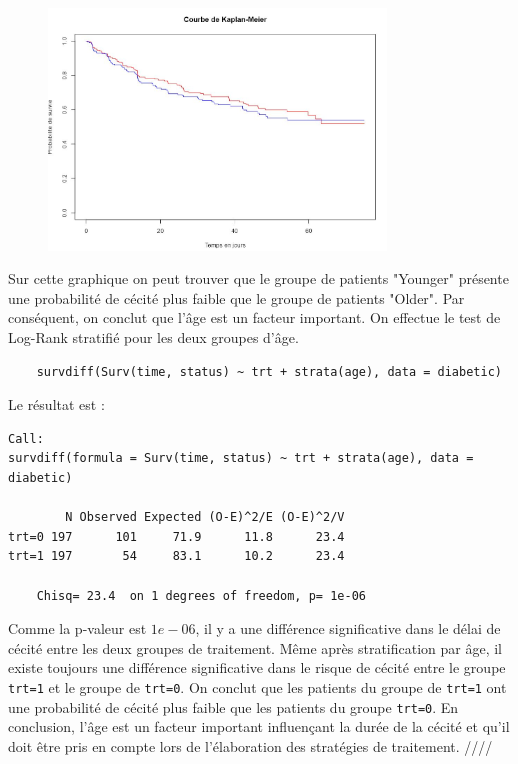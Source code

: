 \documentclass[../main.tex]{subfiles}
\begin{document}
\begin{CJK*}{UTF8}{gbsn}
\begin{figure}[H]
    \centering
    \includegraphics[width=0.8\textwidth]{1F.JPG}
    \label{fig:mesh1}
\end{figure}
  
Sur cette graphique on peut trouver que le groupe de patients "Younger"
présente une probabilité de cécité plus faible que le groupe de patients "Older".
Par conséquent, on conclut que l'âge est un facteur important.
On effectue le test de Log-Rank stratifié pour les deux groupes d'âge.

\begin{lstlisting}
    survdiff(Surv(time, status) ~ trt + strata(age), data = diabetic)
\end{lstlisting}

Le résultat est :

\begin{lstlisting}    
Call:
survdiff(formula = Surv(time, status) ~ trt + strata(age), data = diabetic)
        
        N Observed Expected (O-E)^2/E (O-E)^2/V
trt=0 197      101     71.9      11.8      23.4
trt=1 197       54     83.1      10.2      23.4
        
    Chisq= 23.4  on 1 degrees of freedom, p= 1e-06
\end{lstlisting}

Comme la p-valeur est $1e-06$,
il y a une différence significative dans le délai de cécité entre les deux groupes de traitement.
Même après stratification par âge, il existe toujours une différence 
significative dans le risque de cécité entre le groupe \texttt{trt=1}
et le groupe de \texttt{trt=0}. 
On conclut que les patients du groupe de \texttt{trt=1} ont une probabilité de cécité plus faible que 
les patients du groupe \texttt{trt=0}. 
En conclusion, l'âge est un facteur important influençant la durée 
de la cécité et qu'il doit être pris en compte lors de l'élaboration des stratégies de traitement. ////

\end{CJK*}
\end{document}
